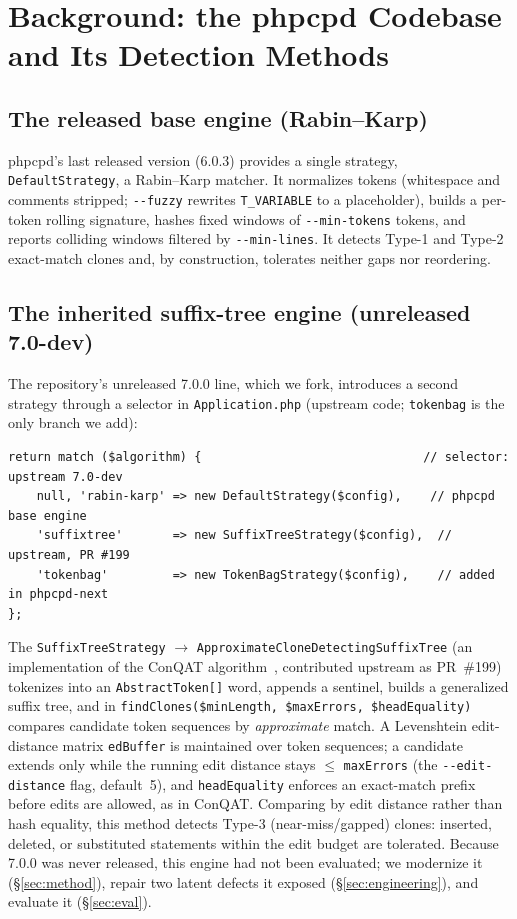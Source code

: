 \documentclass[10pt,a4paper]{article}
\newcounter{lem}[section]
\begin{document}
\section{Background: the phpcpd Codebase and Its Detection Methods}
\label{sec:methods}

\subsection{The released base engine (Rabin--Karp)}
phpcpd's last released version (6.0.3) provides a single strategy, \texttt{DefaultStrategy}, a
Rabin--Karp matcher. It normalizes tokens (whitespace and comments stripped; \texttt{-{}-fuzzy}
rewrites \lstinline!T_VARIABLE! to a placeholder), builds a per-token rolling signature, hashes fixed
windows of \texttt{-{}-min-tokens} tokens, and reports colliding windows filtered by
\texttt{-{}-min-lines}. It detects Type-1 and Type-2 exact-match clones and, by construction, tolerates
neither gaps nor reordering.

\subsection{The inherited suffix-tree engine (unreleased 7.0-dev)}
The repository's unreleased 7.0.0 line, which we fork, introduces a second strategy through a selector
in \texttt{Application.php} (upstream code; \texttt{tokenbag} is the only branch we add):

\begin{lstlisting}[basicstyle=\ttfamily\small]
return match ($algorithm) {                               // selector: upstream 7.0-dev
    null, 'rabin-karp' => new DefaultStrategy($config),    // phpcpd base engine
    'suffixtree'       => new SuffixTreeStrategy($config),  // upstream, PR #199
    'tokenbag'         => new TokenBagStrategy($config),    // added in phpcpd-next
};
\end{lstlisting}

The \texttt{SuffixTreeStrategy} $\rightarrow$ \texttt{ApproximateCloneDetectingSuffixTree} (an
implementation of the ConQAT algorithm~\cite{conqat}, contributed upstream as PR~\#199) tokenizes into
an \texttt{AbstractToken[]} word, appends a sentinel, builds a generalized suffix tree, and in
\lstinline!findClones($minLength, $maxErrors, $headEquality)! compares candidate token sequences by
\emph{approximate} match. A Levenshtein edit-distance matrix \lstinline!edBuffer! is maintained over
token sequences; a candidate extends only while the running edit distance stays $\le$ \texttt{maxErrors}
(the \texttt{-{}-edit-distance} flag, default~5), and \texttt{headEquality} enforces an exact-match
prefix before edits are allowed, as in ConQAT. Comparing by edit distance rather than hash equality,
this method detects Type-3 (near-miss/gapped) clones: inserted, deleted, or substituted statements
within the edit budget are tolerated. Because 7.0.0 was never released, this engine had not been
evaluated; we modernize it (\S\ref{sec:method}), repair two latent defects it exposed
(\S\ref{sec:engineering}), and evaluate it (\S\ref{sec:eval}).
\end{document}
